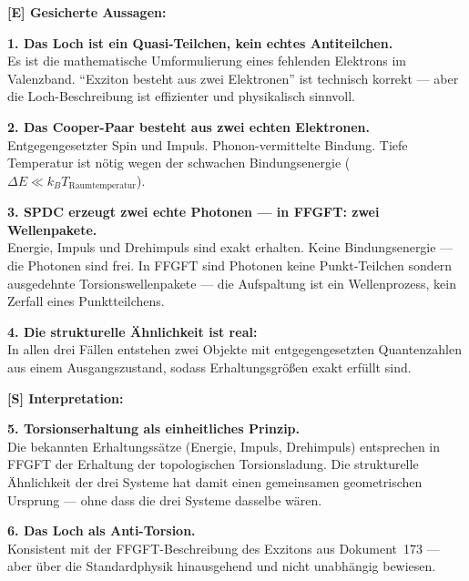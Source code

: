 \begin{conclusionBox}

\textbf{[E] Gesicherte Aussagen:}

\textbf{1. Das Loch ist ein Quasi-Teilchen, kein echtes Antiteilchen.}\\
Es ist die mathematische Umformulierung eines fehlenden Elektrons
im Valenzband. ``Exziton besteht aus zwei Elektronen'' ist
technisch korrekt --- aber die Loch-Beschreibung ist effizienter
und physikalisch sinnvoll.

\textbf{2. Das Cooper-Paar besteht aus zwei echten Elektronen.}\\
Entgegengesetzter Spin und Impuls. Phonon-vermittelte Bindung.
Tiefe Temperatur ist nötig wegen der schwachen Bindungsenergie
($\Delta E \ll k_BT_\text{Raumtemperatur}$).

\textbf{3. SPDC erzeugt zwei echte Photonen --- in FFGFT: zwei Wellenpakete.}\\
Energie, Impuls und Drehimpuls sind exakt erhalten.
Keine Bindungsenergie --- die Photonen sind frei.
In FFGFT sind Photonen keine Punkt-Teilchen sondern
ausgedehnte Torsionswellenpakete --- die Aufspaltung
ist ein Wellenprozess, kein Zerfall eines Punktteilchens.

\textbf{4. Die strukturelle Ähnlichkeit ist real:}\\
In allen drei Fällen entstehen zwei Objekte mit
entgegengesetzten Quantenzahlen aus einem Ausgangszustand,
sodass Erhaltungsgrößen exakt erfüllt sind.

\medskip

\textbf{[S] Interpretation:}

\textbf{5. Torsionserhaltung als einheitliches Prinzip.}\\
Die bekannten Erhaltungssätze (Energie, Impuls, Drehimpuls)
entsprechen in FFGFT der Erhaltung der topologischen
Torsionsladung. Die strukturelle Ähnlichkeit der drei Systeme
hat damit einen gemeinsamen geometrischen Ursprung ---
ohne dass die drei Systeme dasselbe wären.

\textbf{6. Das Loch als Anti-Torsion.}\\
Konsistent mit der FFGFT-Beschreibung des Exzitons
aus Dokument~173 --- aber über die Standardphysik hinausgehend
und nicht unabhängig bewiesen.
\end{conclusionBox}


